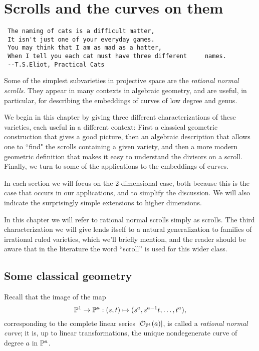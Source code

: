 

\chapter{Scrolls and the curves on them}
\label{ScrollsChapter}


\begin{verbatim}
 The naming of cats is a difficult matter,
 It isn't just one of your everyday games.
 You may think that I am as mad as a hatter,
 When I tell you each cat must have three different 	names.
 --T.S.Eliot, Practical Cats
\end{verbatim}

Some of the simplest subvarieties in projective space are the \emph{rational normal scrolls}. They appear in many contexts in algebraic geometry, and are useful, in particular, for describing the embeddings of curves of low degree and genus. 

We begin in this chapter by giving three different characterizations of these varieties, each useful in a different context: First a classical geometric construction that gives a good picture, then an algebraic description that allows one to ``find" the scrolls containing a given variety, and then a more modern geometric definition that makes it easy to understand the divisors on a scroll. Finally, we turn to some of the applications to the embeddings of curves.

In each section we will focus on the 2-dimensional case, both because this is the case that occurs in our applications, and to simplify the discussion. We will also indicate the surprisingly simple extensions to higher dimensions.

In this chapter we will refer to rational normal scrolls simply as scrolls. The third characterization we will give lends itself to a natural generalization to families of irrational ruled varieties, which we'll briefly mention, and the reader should be aware that in the literature the word ``scroll'' is used for this wider class.

\section{Some classical geometry}

Recall that the image of the map 
$$
\PP^1\to\PP^a: (s,t) \mapsto (s^a, s^{a-1}t, \dots, t^a),
$$
corresponding to the complete linear series
$|\cO_{\PP^1}(a)|$, is called a \emph{rational normal curve}; it is, up to linear transformations, the unique nondegenerate curve of degree $a$ in $\PP^a$.

